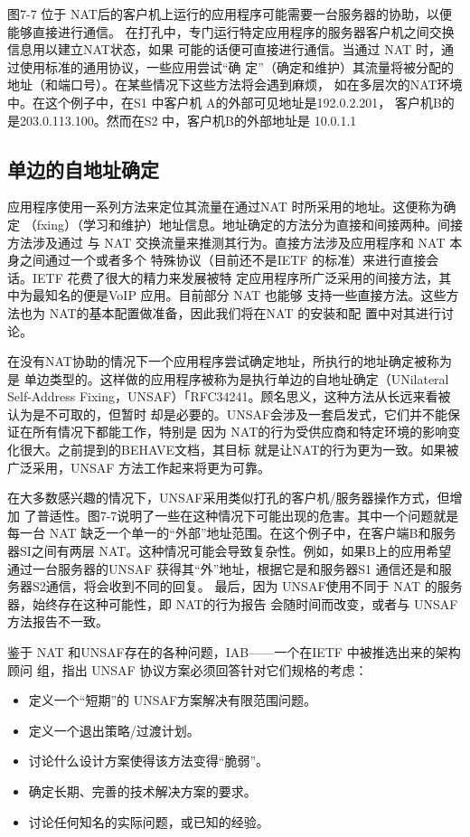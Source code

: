 图7-7
位于 NAT后的客户机上运行的应用程序可能需要一台服务器的协助，以便能够直接进行通信。
在打孔中，专门运行特定应用程序的服务器客户机之间交换信息用以建立NAT状态，如果
可能的话便可直接进行通信。当通过 NAT 时，通过使用标准的通用协议，一些应用尝试“确
定”（确定和维护）其流量将被分配的地址（和端口号）。在某些情况下这些方法将会遇到麻烦，
如在多层次的NAT环境中。在这个例子中，在S1 中客户机 A的外部可见地址是192.0.2.201，
客户机B的是203.0.113.100。然而在S2 中，客户机B的外部地址是 10.0.1.1

\subsection{单边的自地址确定}

应用程序使用一系列方法来定位其流量在通过NAT 时所采用的地址。这便称为确定
（fxing）（学习和维护）地址信息。地址确定的方法分为直接和间接两种。间接方法涉及通过
与 NAT 交换流量来推测其行为。直接方法涉及应用程序和 NAT 本身之间通过一个或者多个
特殊协议（目前还不是IETF 的标准）来进行直接会话。IETF 花费了很大的精力来发展被特
定应用程序所广泛采用的间接方法，其中为最知名的便是VoIP 应用。目前部分 NAT 也能够
支持一些直接方法。这些方法也为 NAT的基本配置做准备，因此我们将在NAT 的安装和配
置中对其进行讨论。

在没有NAT协助的情况下一个应用程序尝试确定地址，所执行的地址确定被称为是
单边类型的。这样做的应用程序被称为是执行单边的自地址确定（UNilateral Self-Address
Fixing，UNSAF）「RFC34241。顾名思义，这种方法从长远来看被认为是不可取的，但暂时
却是必要的。UNSAF会涉及一套启发式，它们并不能保证在所有情况下都能工作，特别是
因为 NAT的行为受供应商和特定环境的影响变化很大。之前提到的BEHAVE文档，其目标
就是让NAT的行为更为一致。如果被广泛采用，UNSAF 方法工作起来将更为可靠。

在大多数感兴趣的情况下，UNSAF采用类似打孔的客户机/服务器操作方式，但增加
了普适性。图7-7说明了一些在这种情况下可能出现的危害。其中一个问题就是每一台 NAT
缺乏一个单一的“外部”地址范围。在这个例子中，在客户端B和服务器SI之间有两层
NAT。这种情况可能会导致复杂性。例如，如果B上的应用希望通过一台服务器的UNSAF
获得其“外”地址，根据它是和服务器S1 通信还是和服务器S2通信，将会收到不同的回复。
最后，因为 UNSAF使用不同于 NAT 的服务器，始终存在这种可能性，即 NAT的行为报告
会随时间而改变，或者与 UNSAF 方法报告不一致。

鉴于 NAT 和UNSAF存在的各种问题，IAB——一个在IETF 中被推选出来的架构顾问
组，指出 UNSAF 协议方案必须回答针对它们规格的考虑：

\begin{itemize}
    \item 定义一个“短期”的 UNSAF方案解决有限范围问题。
    \item 定义一个退出策略/过渡计划。
    \item 讨论什么设计方案使得该方法变得“脆弱”。
    \item 确定长期、完善的技术解决方案的要求。
    \item 讨论任何知名的实际问题，或已知的经验。
\end{itemize}

